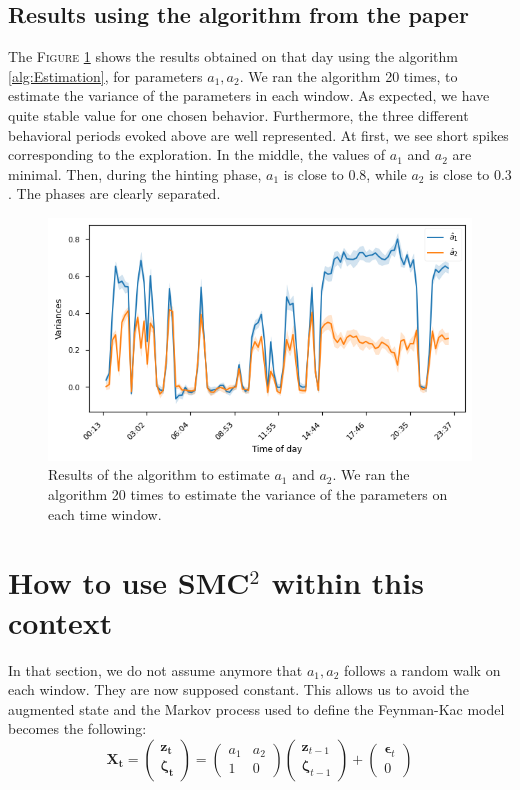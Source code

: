 \subsection{Results using the algorithm from the paper}
The \textsc{Figure} \ref{fig:parameter estimation} shows the results obtained on that day using the algorithm \ref{alg:Estimation}, for parameters $a_1, a_2$. We ran the algorithm 20 times, to estimate the variance of the parameters in each window.  As expected, we have quite stable value for one chosen behavior. Furthermore, the three different behavioral periods evoked above are well represented. At first, we see short spikes corresponding to the exploration. In the middle, the values of $a_1$ and $a_2$ are minimal. Then, during the hinting phase, $a_1$ is close to $0.8$, while $a_2$ is close to $0.3$. The phases are clearly separated.

\begin{figure}
\centering
\includegraphics[width=0.8\linewidth]{images/a1_a2_var_0.5.png}
\caption{Results of the algorithm to estimate $a_1$ and $a_2$. We ran the algorithm 20 times to estimate the variance of the parameters on each time window.}
\label{fig:parameter estimation}
\end{figure}

\section{How to use SMC$^2$ within this context}
In that section, we do not assume anymore that $a_1, a_2$ follows a random walk on each window. They are now supposed constant.
This allows us to avoid the augmented state and the Markov process used to define the Feynman-Kac model becomes the following:
\begin{equation}
    \mathbf{X_t} =
    \begin{pmatrix}
    \mathbf{z_t}\\\mathbf{\zeta_t}
    \end{pmatrix}
    =
    \begin{pmatrix}
    a_1& a_2\\
    1 & 0

    \end{pmatrix}
    \begin{pmatrix}
    \mathbf{z}_{t-1}\\\mathbf{\zeta}_{t-1}
    \end{pmatrix}
    +
    \begin{pmatrix}
    \mathbf{\epsilon}_t \\ 0
    \end{pmatrix}
\end{equation}

